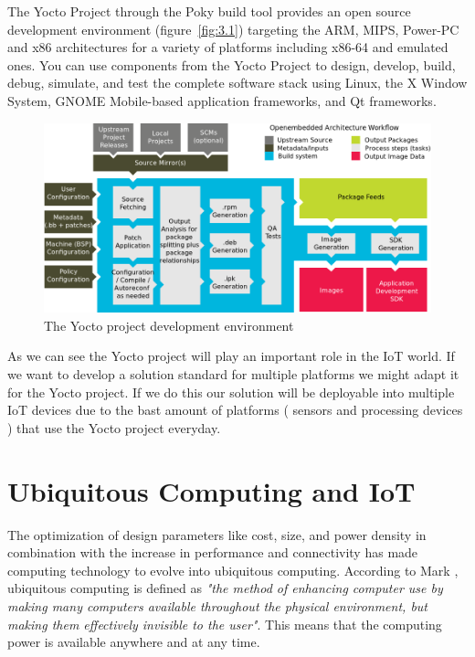 The Yocto Project through the Poky build tool provides an open source
development environment (figure~\ref{fig:3.1})  targeting the ARM, MIPS,
Power-PC and x86 architectures for a variety of platforms including x86-64 and
emulated ones.  You can use components from the Yocto Project to design,
develop, build, debug, simulate, and test the complete software stack using
Linux, the X Window System, GNOME Mobile-based application frameworks, and Qt
frameworks. 

\begin{figure}[H]
\centering
\includegraphics[width=1\textwidth]{images/yocto-environment.png}
\caption{The Yocto project development environment}
\label{fig:3.2}
\end{figure}

As we can see the Yocto project will play an important role in the IoT world.
If we want to develop a solution standard for multiple platforms we might adapt
it for the Yocto project. If we do this our solution will be deployable into
multiple IoT devices due to the bast amount of platforms ( sensors and
processing devices ) that use the Yocto project everyday.

\section{Ubiquitous Computing and IoT}
\noindent

The optimization of design parameters like cost, size, and power density
in combination with the increase in performance and connectivity
has made computing technology to evolve into ubiquitous computing.
According to Mark \cite{Mark}, ubiquitous computing is defined as \textit{"the method of
enhancing computer use by making many computers available throughout the
physical environment, but making them effectively invisible to the user"}. This
means that the computing power is available anywhere and at any time.

